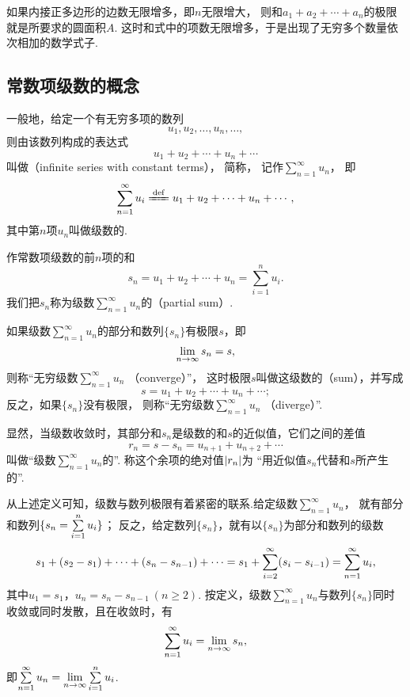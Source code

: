 如果内接正多边形的边数无限增多，即\(n\)无限增大，
则和\(a_1+a_2+\dotsb+a_n\)的极限就是所要求的圆面积\(A\).
这时和式中的项数无限增多，于是出现了无穷多个数量依次相加的数学式子.

\subsection{常数项级数的概念}
\begin{definition}\label{definition:无穷级数.常数项级数的定义}
一般地，给定一个有无穷多项的数列\[
	u_1,u_2,\dotsc,u_n,\dotsc,
\]
则由该数列构成的表达式\[
	u_1+u_2+\dotsb+u_n+\dotsb
\]
叫做（infinite series with constant terms），
简称，
记作\(\sum\limits_{n=1}^\infty u_n\)，
即\[
	\s u_i
	\defeq
	u_1+u_2+\dotsb+u_n+\dotsb,
\]
其中第\(n\)项\(u_n\)叫做级数的.

作常数项级数的前\(n\)项的和\[
	s_n = u_1+u_2+\dotsb+u_n = \sum\limits_{i=1}^n{u_i}.
\]
我们把\(s_n\)称为级数\(\sum\limits_{n=1}^\infty u_n\)的（partial sum）.

如果级数\(\sum\limits_{n=1}^\infty u_n\)的部分和数列\(\{s_n\}\)有极限\(s\)，即\[
	\lim\limits_{n\to\infty} s_n = s,
\]
则称“无穷级数\(\sum\limits_{n=1}^\infty u_n\) （converge）”，
这时极限\(s\)叫做这级数的（sum），并写成\[
	s = u_1+u_2+\dotsb+u_n+\dotsb;
\]
反之，如果\(\{s_n\}\)没有极限，
则称“无穷级数\(\sum\limits_{n=1}^\infty u_n\) （diverge）”.

显然，当级数收敛时，其部分和\(s_n\)是级数的和\(s\)的近似值，它们之间的差值\[
	r_n = s - s_n = u_{n+1}+u_{n+2}+\dotsb
\]
叫做“级数\(\sum\limits_{n=1}^\infty u_n\)的”.
称这个余项的绝对值\(\abs{r_n}\)为%
“用近似值\(s_n\)代替和\(s\)所产生的”.
\end{definition}
从上述定义可知，级数与数列极限有着紧密的联系.给定级数\(\sum\limits_{n=1}^\infty u_n\)，
就有部分和数列\(\{s_n = \sum\limits_{i=1}^n u_i\}\)；
反之，给定数列\(\{s_n\}\)，就有以\(\{s_n\}\)为部分和数列的级数\[
	s_1 + (s_2-s_1) + \dotsb + (s_n-s_{n-1}) + \dotsb
	= s_1 + \sum\limits_{i=2}^\infty (s_i-s_{i-1})
	= \sum\limits_{n=1}^\infty u_i,
\]
其中\(u_1=s_1\)，\(u_n=s_n-s_{n-1}\ (n \geq 2)\).
按定义，级数\(\sum\limits_{n=1}^\infty u_n\)与数列\(\{s_n\}\)同时收敛或同时发散，且在收敛时，有\[
	\sum\limits_{n=1}^\infty u_i = \lim\limits_{n\to\infty} s_n,
\]
即\(\sum\limits_{n=1}^\infty u_n = \lim\limits_{n\to\infty} \sum\limits_{i=1}^n u_i\).

